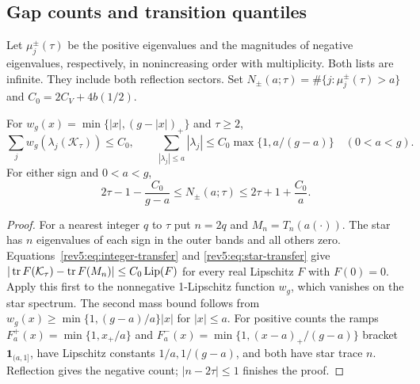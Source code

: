 \subsection{Gap counts and transition quantiles}\label{v7:sec:quantiles}
Let $\mu_j^\pm(\tau)$ be the positive eigenvalues and the magnitudes of
negative eigenvalues, respectively, in nonincreasing order with multiplicity.
Both lists are infinite. They include both reflection sectors.
Set $N_\pm(a;\tau)=\#\{j:\mu_j^\pm(\tau)>a\}$ and $C_0=2C_V+4b(1/2)$.
\begin{proposition}
\label{v7:prop:gap-mass}\label{v7:prop:count-plateau}
For $w_g(x)=\min\{|x|,(g-|x|)_+\}$ and $\tau\ge2$,
\[
 \sum_jw_g(\lambda_j(\mathcal K_\tau))\le C_0,\qquad
 \sum_{|\lambda_j|\le a}|\lambda_j|
 \le C_0\max\{1,a/(g-a)\}\quad(0<a<g).
\]
For either sign and $0<a<g$,
\begin{equation}\label{v7:eq:count-plateau}
 2\tau-1-\frac{C_0}{g-a}\le N_\pm(a;\tau)
                 \le2\tau+1+\frac{C_0}{a}.
\end{equation}
\end{proposition}
\begin{proof}
For a nearest integer $q$ to $\tau$ put $n=2q$ and $M_n=T_n(a(\cdot))$.
The star has $n$ eigenvalues of each sign in the outer bands and all others
zero. Equations~\eqref{rev5:eq:integer-transfer} and
\eqref{rev5:eq:star-transfer} give
$|\operatorname{tr} F(\mathcal K_\tau)-\operatorname{tr} F(M_n)|\le C_0\operatorname{Lip}(F)$
for every real Lipschitz $F$ with $F(0)=0$.
Apply this first to the nonnegative 1-Lipschitz function $w_g$, which
vanishes on the star spectrum. The second mass bound follows from
$w_g(x)\ge\min\{1,(g-a)/a\}|x|$ for $|x|\le a$.
For positive counts the ramps
$F_a^+(x)=\min\{1,x_+/a\}$ and
$F_a^-(x)=\min\{1,(x-a)_+/(g-a)\}$ bracket $\mathbf1_{(a,1]}$,
have Lipschitz constants $1/a,1/(g-a)$, and both have star trace $n$.
Reflection gives the negative count; $|n-2\tau|\le1$ finishes the proof.
\end{proof}

